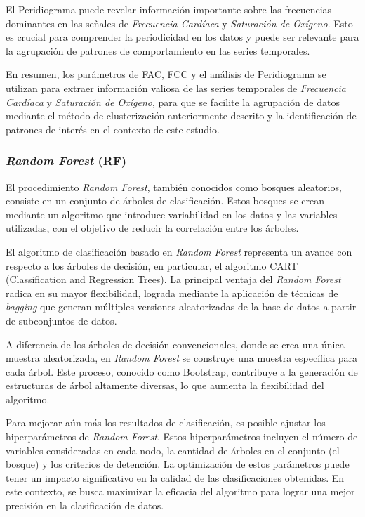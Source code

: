 El Peridiograma puede revelar información importante sobre las frecuencias dominantes en las señales de \textit{Frecuencia Cardíaca} y \textit{Saturación de Oxígeno}. Esto es crucial para comprender la periodicidad en los datos y puede ser relevante para la agrupación de patrones de comportamiento en las series temporales.

En resumen, los parámetros de FAC, FCC y el análisis de Peridiograma se utilizan para extraer información valiosa de las series temporales de \textit{Frecuencia Cardíaca} y \textit{Saturación de Oxígeno}, para que se facilite la agrupación de datos mediante el método de clusterización anteriormente descrito y la identificación de patrones de interés en el contexto de este estudio.


\subsubsection{\textit{Random Forest} (RF)}\label{sec:rf}

El procedimiento \textit{Random Forest}, también conocidos como bosques aleatorios, consiste en un conjunto de árboles de clasificación. Estos bosques se crean mediante un algoritmo que introduce variabilidad en los datos y las variables utilizadas, con el objetivo de reducir la correlación entre los árboles.

El algoritmo de clasificación basado en \textit{Random Forest} representa un avance con respecto a los árboles de decisión, en particular, el algoritmo CART (Classification and Regression Trees). La principal ventaja del \textit{Random Forest} radica en su mayor flexibilidad, lograda mediante la aplicación de técnicas de \textit{bagging} que generan múltiples versiones aleatorizadas de la base de datos a partir de subconjuntos de datos.

A diferencia de los árboles de decisión convencionales, donde se crea una única muestra aleatorizada, en \textit{Random Forest} se construye una muestra específica para cada árbol. Este proceso, conocido como Bootstrap, contribuye a la generación de estructuras de árbol altamente diversas, lo que aumenta la flexibilidad del algoritmo.

Para mejorar aún más los resultados de clasificación, es posible ajustar los hiperparámetros de \textit{Random Forest}. Estos hiperparámetros incluyen el número de variables consideradas en cada nodo, la cantidad de árboles en el conjunto (el bosque) y los criterios de detención. La optimización de estos parámetros puede tener un impacto significativo en la calidad de las clasificaciones obtenidas. En este contexto, se busca maximizar la eficacia del algoritmo para lograr una mejor precisión en la clasificación de datos.

